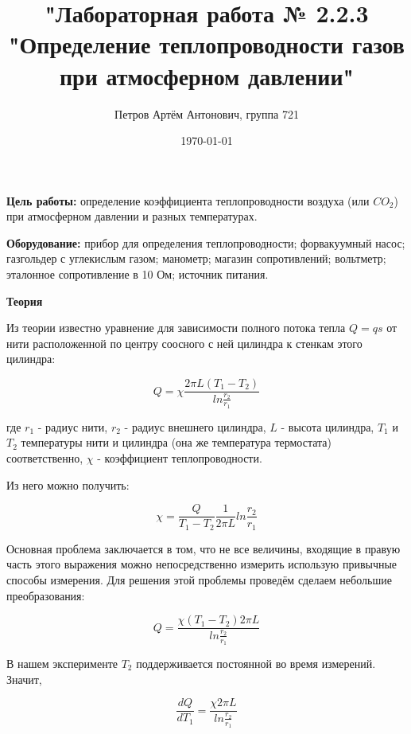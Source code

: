 \documentclass[a4paper,12pt]{article}
\author{Петров Артём Антонович, группа 721}
\title{"Лабораторная работа № 2.2.3 "Определение теплопроводности газов при атмосферном давлении"}
\date{\today}
\begin{document}

\begin{minipage}[t][8cm]{\textwidth}
\maketitle
\end{minipage}


\textbf{Цель работы:} определение коэффициента теплопроводности воздуха (или $ CO_2 $) при атмосферном давлении и разных температурах.
\bigskip

\textbf{Оборудование:} прибор для определения теплопроводности; форвакуумный насос; газгольдер с углекислым газом; манометр; магазин сопротивлений; вольтметр; эталонное сопротивление в 10 Ом; источник питания.
\bigskip

\textbf{Теория}
\bigskip

Из теории известно уравнение для зависимости полного потока тепла $Q=qs$ от нити расположенной по центру соосного с ней цилиндра к стенкам этого цилиндра:

\begin{equation} \label{eq-useless}
Q = \chi \frac{2 \pi L (T_1 - T_2)}{ln \frac{r_2}{r_1}}
\end{equation}


где $r_1$ - радиус нити, $r_2$ - радиус внешнего цилиндра, $L$ - высота цилиндра, $T_1$ и $T_2$ температуры нити и цилиндра (она же температура термостата) соответственно, $\chi$ - коэффициент теплопроводности.

Из него можно получить:

\begin{equation} \label{eq-basic}
\chi = \frac{Q}{T_1 - T_2} \frac{1}{2 \pi L} ln\frac{r_2}{r_1}
\end{equation}


Основная проблема заключается в том, что не все величины, входящие в правую часть этого выражения можно непосредственно измерить использую привычные способы измерения. Для решения этой проблемы проведём сделаем небольшие преобразования:

\begin{equation} \label{eq-basic1}
Q = \frac{\chi(T_1 - T_2) 2 \pi L}{ln\frac{r_2}{r_1}}
\end{equation}

В нашем эксперименте $T_2$ поддерживается постоянной во время измерений. Значит,

\begin{equation} \label{eq-basic2}
\frac{dQ}{dT_1} = \frac{\chi 2 \pi L}{ln\frac{r_2}{r_1}} 
\end{equation}
\end{document}
